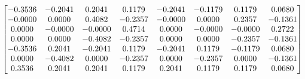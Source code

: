 \documentclass{glimmpse-report}
\begin{document}
\begin{eqnarray*}
\begin{bmatrix}
-0.3536 & -0.2041 & 0.2041 & 0.1179 & -0.2041 & -0.1179 & 0.1179 & 0.0680\protect\\
-0.0000 & 0.0000 & 0.4082 & -0.2357 & -0.0000 & 0.0000 & 0.2357 & -0.1361\protect\\
0.0000 & -0.0000 & -0.0000 & 0.4714 & 0.0000 & -0.0000 & -0.0000 & 0.2722\protect\\
0.0000 & 0.0000 & -0.4082 & -0.2357 & 0.0000 & 0.0000 & -0.2357 & -0.1361\protect\\
-0.3536 & 0.2041 & -0.2041 & 0.1179 & -0.2041 & 0.1179 & -0.1179 & 0.0680\protect\\
0.0000 & -0.4082 & 0.0000 & -0.2357 & 0.0000 & -0.2357 & 0.0000 & -0.1361\protect\\
0.3536 & 0.2041 & 0.2041 & 0.1179 & 0.2041 & 0.1179 & 0.1179 & 0.0680\protect\\
\end{bmatrix}
\end{eqnarray*}
\end{document}
